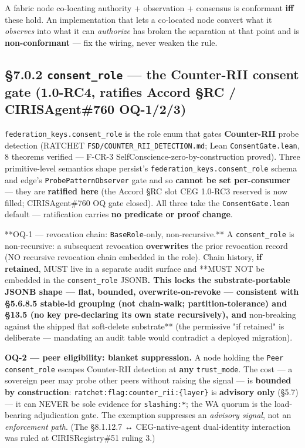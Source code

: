 \documentclass[11pt]{article}
\begin{document}
A fabric node co-locating authority + observation + consensus is conformant \textbf{iff} these hold. An implementation that lets a co-located node convert what it \textit{observes} into what it can \textit{authorize} has broken the separation at that point and is \textbf{non-conformant} — fix the wiring, never weaken the rule.


\subsection*{§7.0.2 \texttt{consent\_role} — the Counter-RII consent gate (1.0-RC4, ratifies Accord §RC / CIRISAgent\#760 OQ-1/2/3)}


\texttt{federation\_keys.consent\_role} is the role enum that gates \textbf{Counter-RII} probe detection (RATCHET \texttt{FSD/COUNTER\_RII\_DETECTION.md}; Lean \texttt{ConsentGate.lean}, 8 theorems verified — F-CR-3 SelfConscience-zero-by-construction proved). Three primitive-level semantics shape persist's \texttt{federation\_keys.consent\_role} schema and edge's \texttt{ProbePatternObserver} gate and so \textbf{cannot be set per-consumer} — they are \textbf{ratified here} (the Accord §RC slot CEG 1.0-RC3 reserved is now filled; CIRISAgent\#760 OQ gate closed). All three take the \texttt{ConsentGate.lean} default — ratification carries \textbf{no predicate or proof change}.


**OQ-1 — revocation chain: \texttt{BaseRole}-only, non-recursive.** A \texttt{consent\_role} is non-recursive: a subsequent revocation \textbf{overwrites} the prior revocation record (NO recursive revocation chain embedded in the role). Chain history, \textbf{if retained}, MUST live in a separate audit surface and **MUST NOT be embedded in the \texttt{consent\_role} JSONB\textbf{. This locks the substrate-portable JSONB shape — flat, bounded, overwrite-on-revoke — consistent with §5.6.8.5 stable-id grouping (not chain-walk; partition-tolerance) and §13.5 (no key pre-declaring its own state recursively), and }non-breaking against the shipped flat soft-delete substrate** (the permissive "if retained" is deliberate — mandating an audit table would contradict a deployed migration).


\textbf{OQ-2 — peer eligibility: blanket suppression.} A node holding the \texttt{Peer} \texttt{consent\_role} escapes Counter-RII detection at \textbf{any} \texttt{trust\_mode}. The cost — a sovereign peer may probe other peers without raising the signal — is \textbf{bounded by construction}: \texttt{ratchet:flag:counter\_rii:\{layer\}} is \textbf{advisory only} (§5.7) — it can NEVER be sole evidence for \texttt{slashing:*}; the WA quorum is the load-bearing adjudication gate. The exemption suppresses an \textit{advisory signal}, not an \textit{enforcement path}. (The §8.1.12.7 ↔ CEG-native-agent dual-identity interaction was ruled at CIRISRegistry\#51 ruling 3.)
\end{document}
